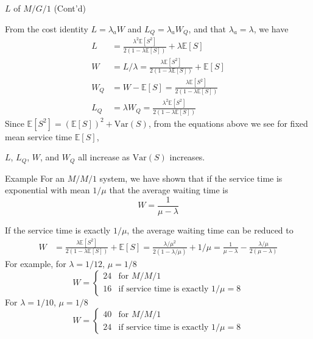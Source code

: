 \documentclass[letterpaper]{beamer}
\def\E{\mathbb E}
\def\V{\mathrm{Var}}
\begin{document}
\begin{frame}{$L$ of $M/G/1$ (Cont'd)}

From the cost identity $L=\lambda_a W$ and $L_Q=\lambda_a W_Q$, and that $\lambda_a=\lambda$, we have
\begin{align*}
L&=\frac{\lambda^2\E[S^2]}{2(1-\lambda\E[S])}+\lambda\E[S]\\
W&=L/\lambda = \frac{\lambda\E[S^2]}{2(1-\lambda\E[S])}+\E[S]\\
W_Q &= W-\E[S]=\frac{\lambda\E[S^2]}{2(1-\lambda\E[S])}\\
L_Q &=\lambda W_Q=\frac{\lambda^2\E[S^2]}{2(1-\lambda\E[S])}
\end{align*}
Since $\E[S^2]=(\E[S])^2+\V(S)$, from the equations above we see for fixed mean service time $\E[S]$,
\begin{center}
$L$, $L_Q$, $W$, and $W_Q$ all increase as $\V(S)$ increases.
\end{center}
\end{frame}
\begin{frame}{Example}
For an $M/M/1$ system, we have shown that
if the service time is exponential with mean $1/\mu$ that the average waiting time is
$$W=\frac{1}{\mu-\lambda}$$

If the service time is exactly $1/\mu$, the average waiting time can be reduced to
\begin{align*}
W&=\frac{\lambda\E[S^2]}{2(1-\lambda\E[S])}+\E[S]=\frac{\lambda/\mu^2}{2(1-\lambda/\mu)}+1/\mu=\frac{1}{\mu-\lambda}-\frac{\lambda/\mu}{2(\mu-\lambda)}
\end{align*}
For example, for $\lambda=1/12$, $\mu=1/8$
$$
W=\begin{cases}
24 & \mbox{for } M/M/1\\
16 & \mbox{if service time is exactly $1/\mu=8$}
\end{cases}
$$
For $\lambda=1/10$, $\mu=1/8$
$$
W=\begin{cases}
40 & \mbox{for } M/M/1\\
24 & \mbox{if service time is exactly $1/\mu=8$}
\end{cases}
$$
\end{frame}
\end{document}
